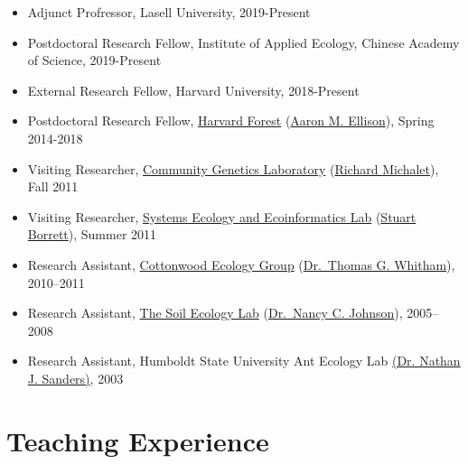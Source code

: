 \documentclass[a4paper]{article}
\begin{document}
\begin{itemize}
\item Adjunct Profressor, Lasell University, 2019-Present
\item Postdoctoral Research Fellow, Institute of Applied Ecology,
  Chinese Academy of Science, 2019-Present
\item External Research Fellow, Harvard University, 2018-Present
\item
  Postdoctoral Research Fellow, 
  \href{http://harvardforest.fas.harvard.edu/}{Harvard Forest}
  (\href{http://harvardforest.fas.harvard.edu/aaron-ellison}{Aaron M. Ellison}), Spring 2014-2018
\item
  Visiting Researcher,
  \href{https://www4.bordeaux-aquitaine.inra.fr/biogeco/}{Community
  Genetics Laboratory}
  (\href{http://www4.bordeaux-aquitaine.inra.fr/biogeco_eng/People/Former-members/Michalet-Richard}{Richard Michalet}), Fall 2011
\item
  Visiting Researcher, \href{http://people.uncw.edu/borretts/}{Systems
  Ecology and Ecoinformatics Lab}
  (\href{http://people.uncw.edu/borretts/people.html}{Stuart
  Borrett}), Summer 2011
\item
  Research Assistant, \href{http://www.poplar.nau.edu/}{Cottonwood
  Ecology Group}
  (\href{http://www.poplar.nau.edu/people.php?mode=showus\&user=tgw}{Dr.~Thomas
  G. Whitham}), 2010--2011
\item
  Research Assistant,
  \href{http://www.nau.edu/~envsci/johnsonlab/index.htm}{The Soil
  Ecology Lab}
  (\href{http://www.nau.edu/~envsci/johnsonlab/NCJ.htm}{Dr.~Nancy C.
  Johnson}), 2005--2008
\item
  Research Assistant, Humboldt State University Ant Ecology Lab
  \href{http://web.utk.edu/~nsanders/nate.html}{(Dr. Nathan J.
  Sanders)}, 2003
\end{itemize}

\section{Teaching Experience}\label{teaching-experience}
\end{document}
